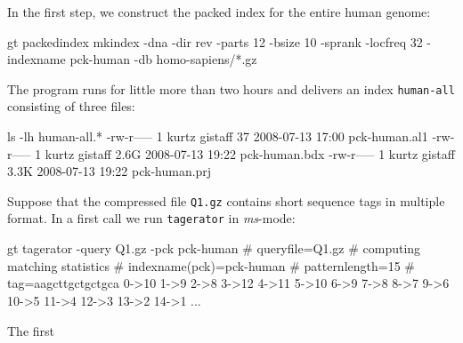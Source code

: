 \documentclass[12pt]{article}
\newcommand{\Program}[0]{\texttt{tagerator}\xspace}
\begin{document}
In the first step, we construct the packed index for the entire human genome:

\begin{Output}
gt packedindex mkindex -dna -dir rev -parts 12 -bsize 10 -sprank -locfreq 32
                       -indexname pck-human -db homo-sapiens/*.gz
\end{Output}

The program runs for little more than two hours and delivers 
an index \texttt{human-all} consisting of three files:

\begin{Output}
ls -lh human-all.*
-rw-r----- 1 kurtz gistaff   37 2008-07-13 17:00 pck-human.al1
-rw-r----- 1 kurtz gistaff 2.6G 2008-07-13 19:22 pck-human.bdx
-rw-r----- 1 kurtz gistaff 3.3K 2008-07-13 19:22 pck-human.prj
\end{Output}

Suppose that the compressed file \texttt{Q1.gz} contains short sequence tags
in multiple \Fasta format. In a first call we run \Program in \textit{ms}-mode:

\begin{Output}
gt tagerator -query Q1.gz -pck pck-human
# queryfile=Q1.gz
# computing matching statistics
# indexname(pck)=pck-human
# patternlength=15
# tag=aagcttgctgctgca
0->10
1->9
2->8
3->12
4->11
5->10
6->9
7->8
8->7
9->6
10->5
11->4
12->3
13->2
14->1
...
\end{Output}
The first
\end{document}
